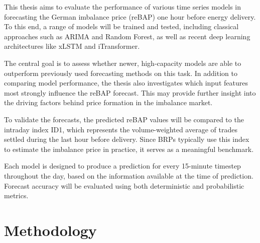 \documentclass[class=scrbook, crop=false]{standalone}
\begin{document}

This thesis aims to evaluate the performance of various time series models in forecasting the German imbalance price (reBAP) one hour before energy delivery. To this end, a range of models will be trained and tested, including classical approaches such as ARIMA and Random Forest, as well as recent deep learning architectures like xLSTM and iTransformer.

The central goal is to assess whether newer, high-capacity models are able to outperform previously used forecasting methods on this task. In addition to comparing model performance, the thesis also investigates which input features most strongly influence the reBAP forecast. This may provide further insight into the driving factors behind price formation in the imbalance market.

To validate the forecasts, the predicted reBAP values will be compared to the intraday index ID1, which represents the volume-weighted average of trades settled during the last hour before delivery. Since BRPs typically use this index to estimate the imbalance price in practice, it serves as a meaningful benchmark.

Each model is designed to produce a prediction for every 15-minute timestep throughout the day, based on the information available at the time of prediction. Forecast accuracy will be evaluated using both deterministic and probabilistic metrics.

\section{Methodology}
\label{Section::Methodology}

\end{document}
